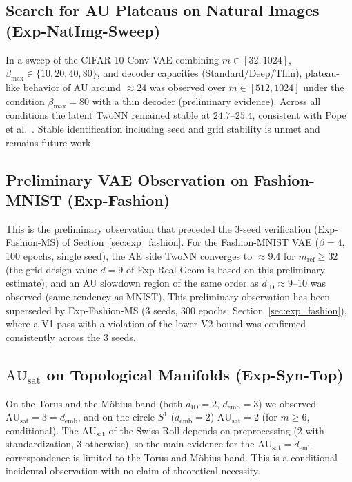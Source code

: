 \documentclass[make,article,submit,pdftex,moreauthors]{Definitions/mdpi}
\newcommand{\dID}{d_{\mathrm{ID}}}
\newcommand{\hatdID}{\hat{d}_{\mathrm{ID}}}
\newcommand{\AUsat}{\mathrm{AU}_{\mathrm{sat}}}
\newcommand{\demb}{d_{\mathrm{emb}}}
\begin{document}
\subsection[\appendixname~\thesubsection]{Search for AU Plateaus on Natural Images (Exp-NatImg-Sweep)}

In a sweep of the CIFAR-10 Conv-VAE combining $m \in [32, 1024]$,
$\beta_{\max} \in \{10, 20, 40, 80\}$, and decoder capacities
(Standard/Deep/Thin), plateau-like behavior of AU around $\approx 24$ was
observed over $m \in [512, 1024]$ under the condition
$\beta_{\max} = 80$ with a thin decoder (preliminary evidence).
Across all conditions the latent TwoNN remained stable at $24.7$--$25.4$,
consistent with Pope et al.~\cite{pope2021intrinsic}.
Stable identification including seed and grid stability is unmet and remains
future work.

\subsection[\appendixname~\thesubsection]{Preliminary VAE Observation on Fashion-MNIST (Exp-Fashion)}

This is the preliminary observation that preceded the 3-seed verification
(Exp-Fashion-MS) of Section~\ref{sec:exp_fashion}.
For the Fashion-MNIST VAE ($\beta = 4$, 100 epochs, single seed), the AE
side TwoNN converges to $\approx 9.4$ for $m_{\mathrm{ref}} \geq 32$ (the
grid-design value $d = 9$ of Exp-Real-Geom is based on this preliminary
estimate), and an AU slowdown region of the same order as
$\hatdID \approx 9$--10 was observed (same tendency as MNIST).
This preliminary observation has been superseded by Exp-Fashion-MS
(3 seeds, 300 epochs; Section~\ref{sec:exp_fashion}), where a V1 pass with
a violation of the lower V2 bound was confirmed consistently across the 3
seeds.

\subsection[\appendixname~\thesubsection]{$\AUsat$ on Topological Manifolds (Exp-Syn-Top)}

On the Torus and the M\"obius band (both $\dID = 2$, $\demb = 3$) we
observed $\AUsat = 3 = \demb$, and on the circle $S^1$ ($\demb = 2$)
$\AUsat = 2$ (for $m \geq 6$, conditional).
The $\AUsat$ of the Swiss Roll depends on preprocessing (2 with
standardization, 3 otherwise), so the main evidence for the
$\AUsat = \demb$ correspondence is limited to the Torus and M\"obius band.
This is a conditional incidental observation with no claim of theoretical
necessity.
\end{document}
